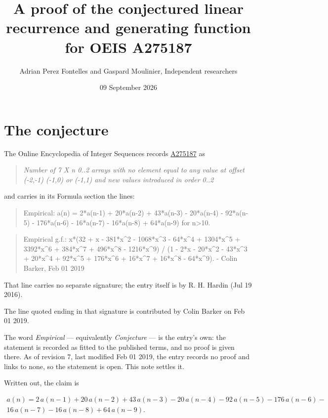 \documentclass[11pt]{article}
\title{A proof of the conjectured linear recurrence and generating function for OEIS A275187}
\author{Adrian Perez Fontelles and Gaspard Moulinier, Independent researchers}
\date{09 September 2026}
\theoremstyle{definition}
\begin{document}
\maketitle
\section{The conjecture}

The Online Encyclopedia of Integer Sequences records \href{https://oeis.org/A275187}{A275187} as

\begin{quote}\itshape Number of 7 X n 0..2 arrays with no element equal to any value at offset (-2,-1) (-1,0) or (-1,1) and new values introduced in order 0..2\end{quote}

and carries in its Formula section the lines:

\begin{quote}\ttfamily Empirical: a(n) = 2*a(n-1) + 20*a(n-2) + 43*a(n-3) - 20*a(n-4) - 92*a(n-5) - 176*a(n-6) - 16*a(n-7) - 16*a(n-8) + 64*a(n-9) for n>10.\end{quote}

\begin{quote}\ttfamily Empirical g.f.: x*(32 + x - 381*x\textasciicircum{}2 - 1068*x\textasciicircum{}3 - 64*x\textasciicircum{}4 + 1304*x\textasciicircum{}5 + 3392*x\textasciicircum{}6 + 384*x\textasciicircum{}7 + 496*x\textasciicircum{}8 - 1216*x\textasciicircum{}9) / (1 - 2*x - 20*x\textasciicircum{}2 - 43*x\textasciicircum{}3 + 20*x\textasciicircum{}4 + 92*x\textasciicircum{}5 + 176*x\textasciicircum{}6 + 16*x\textasciicircum{}7 + 16*x\textasciicircum{}8 - 64*x\textasciicircum{}9). - Colin Barker, Feb 01 2019\end{quote}

That line carries no separate signature; the entry itself is by R. H. Hardin (Jul 19 2016).

The line quoted ending in that signature is contributed by Colin Barker on Feb 01 2019.

The word {\itshape Empirical} --- equivalently {\itshape Conjecture} --- is the entry's own: the statement is recorded as fitted to the published terms, and no proof is given there. As of revision 7, last modified Feb 01 2019, the entry records no proof and links to none, so the statement is open. This note settles it.

Written out, the claim is

\begin{multline*} a(n) = 2\,a(n-1) + 20\,a(n-2) + 43\,a(n-3) - 20\,a(n-4) - 92\,a(n-5) - 176\,a(n-6) - \\ 16\,a(n-7) - 16\,a(n-8) + 64\,a(n-9). \end{multline*}
\end{document}
